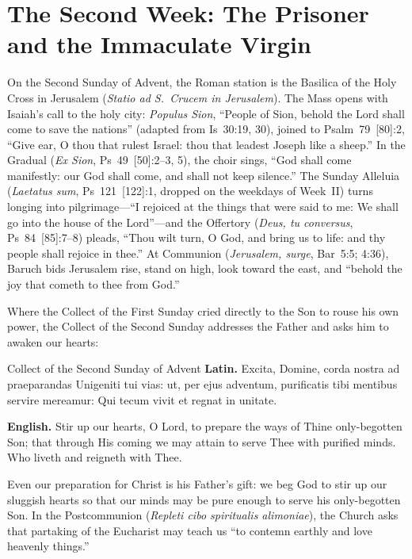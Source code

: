 \section{The Second Week: The Prisoner and the Immaculate Virgin}\label{sec:week-2}

On the Second Sunday of Advent, the Roman station is the Basilica of the
Holy Cross in Jerusalem (\textit{Statio ad S.\ Crucem in Jerusalem}).
The Mass opens with Isaiah's call to the holy city: \textit{Populus
Sion}, ``People of Sion, behold the Lord shall come to save the
nations'' (adapted from Is~30:19, 30), joined to Psalm~79~[80]:2, ``Give
ear, O thou that rulest Israel: thou that leadest Joseph like a sheep.''
In the Gradual (\textit{Ex Sion}, Ps~49~[50]:2--3, 5), the choir sings,
``God shall come manifestly: our God shall come, and shall not keep
silence.'' The Sunday Alleluia (\textit{Laetatus sum}, Ps~121~[122]:1,
dropped on the weekdays of Week~II) turns longing into pilgrimage---``I
rejoiced at the things that were said to me: We shall go into the house
of the Lord''---and the Offertory (\textit{Deus, tu conversus},
Ps~84~[85]:7--8) pleads, ``Thou wilt turn, O God, and bring us to life:
and thy people shall rejoice in thee.'' At Communion (\textit{Jerusalem,
surge}, Bar~5:5; 4:36), Baruch bids Jerusalem rise, stand on high, look
toward the east, and ``behold the joy that cometh to thee from God.''

Where the Collect of the First Sunday cried directly to the Son to rouse
his own power, the Collect of the Second Sunday addresses the Father and
asks him to awaken our hearts:

\begin{massbox}{Collect of the Second Sunday of Advent}
\textbf{Latin.} Excita, Domine, corda nostra ad praeparandas Unigeniti
tui vias: ut, per ejus adventum, purificatis tibi mentibus servire
mereamur: Qui tecum vivit et regnat in unitate.

\textbf{English.} Stir up our hearts, O Lord, to prepare the ways of
Thine only-begotten Son; that through His coming we may attain to serve
Thee with purified minds. Who liveth and reigneth with Thee.
\end{massbox}

Even our preparation for Christ is his Father's gift: we beg God to stir
up our sluggish hearts so that our minds may be pure enough to serve his
only-begotten Son. In the Postcommunion (\textit{Repleti cibo
spiritualis alimoniae}), the Church asks that partaking of the Eucharist
may teach us ``to contemn earthly and love heavenly things.''

